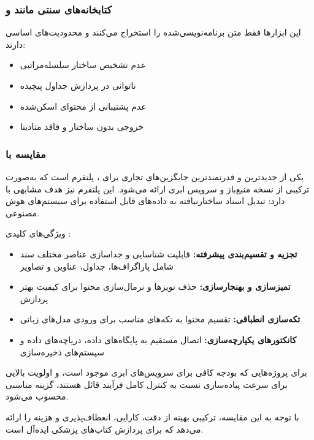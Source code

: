 \subsubsection{کتابخانه‌های سنتی  مانند  و }
این ابزارها فقط متن برنامه‌نویسی‌شده  را استخراج می‌کنند و محدودیت‌های اساسی دارند:

\begin{itemize}
    \item عدم تشخیص ساختار سلسله‌مراتبی
    \item ناتوانی در پردازش جداول پیچیده
    \item عدم پشتیبانی از محتوای اسکن‌شده
    \item خروجی بدون ساختار و فاقد متادیتا
\end{itemize}

\subsubsection{مقایسه با }
یکی از جدیدترین و قدرتمندترین جایگزین‌های تجاری برای ، پلتفرم  است که به‌صورت ترکیبی از نسخه منبع‌باز و سرویس ابری ارائه می‌شود. این پلتفرم نیز هدف مشابهی با  دارد: تبدیل اسناد ساختارنیافته به داده‌های قابل استفاده برای سیستم‌های هوش مصنوعی.

\noindent
ویژگی‌های کلیدی :
\begin{itemize}
    \item \textbf{تجزیه و تقسیم‌بندی پیشرفته:} قابلیت شناسایی و جداسازی عناصر مختلف سند شامل پاراگراف‌ها، جداول، عناوین و تصاویر
    \item \textbf{تمیزسازی و بهنجارسازی:} حذف نویزها و نرمال‌سازی محتوا برای کیفیت بهتر پردازش
    \item \textbf{تکه‌سازی انطباقی:} تقسیم محتوا به تکه‌های مناسب برای ورودی مدل‌های زبانی
    \item \textbf{کانکتورهای یکپارچه‌سازی:} اتصال مستقیم به پایگاه‌های داده، دریاچه‌های داده و سیستم‌های ذخیره‌سازی
\end{itemize}


\noindent
{} برای پروژه‌هایی که بودجه کافی برای سرویس‌های ابری موجود است، و اولویت بالایی برای سرعت پیاده‌سازی نسبت به کنترل کامل فرآیند قائل هستند، گزینه مناسبی محسوب می‌شود.

\noindent
با توجه به این مقایسه،  ترکیبی بهینه از دقت، کارایی، انعطاف‌پذیری و هزینه را ارائه می‌دهد که برای پردازش کتاب‌های پزشکی ایده‌آل است.

